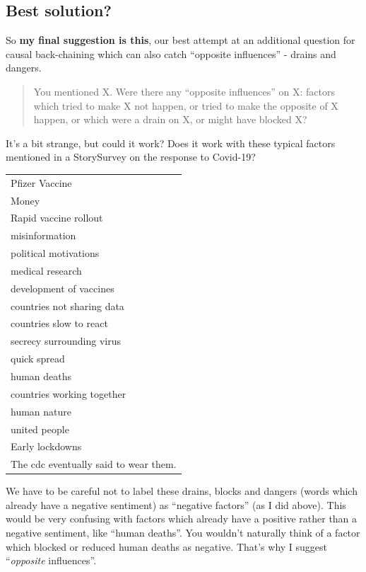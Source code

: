 \documentclass[
]{book}
\begin{document}
\hypertarget{best-solution}{%
\subsection{Best solution?}\label{best-solution}}

So \textbf{my final suggestion is this}, our best attempt at an additional question for causal back-chaining which can also catch ``opposite influences'' - drains and dangers.

\begin{quote}
You mentioned X. Were there any ``opposite influences'' on X: factors which tried to make X not happen, or tried to make the opposite of X happen, or which were a drain on X, or might have blocked X?
\end{quote}

It's a bit strange, but could it work? Does it work with these typical factors mentioned in a StorySurvey on the response to Covid-19?

\begin{longtable}[]{@{}l@{}}
\toprule
\endhead
Pfizer Vaccine \\
Money \\
Rapid vaccine rollout \\
misinformation \\
political motivations \\
medical research \\
development of vaccines \\
countries not sharing data \\
countries slow to react \\
secrecy surrounding virus \\
quick spread \\
human deaths \\
countries working together \\
human nature \\
united people \\
Early lockdowns \\
The cdc eventually said to wear them. \\
\bottomrule
\end{longtable}

We have to be careful not to label these drains, blocks and dangers (words which already have a negative sentiment) as ``negative factors'' (as I did above). This would be very confusing with factors which already have a positive rather than a negative sentiment, like ``human deaths''. You wouldn't naturally think of a factor which blocked or reduced human deaths as negative. That's why I suggest ``\emph{opposite} influences''.
\end{document}
